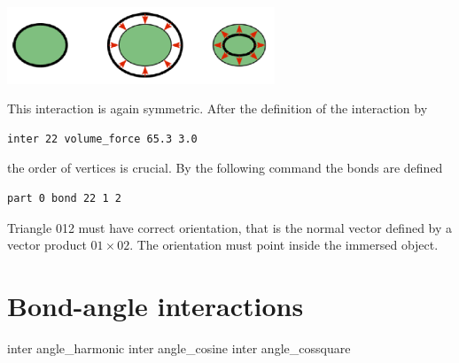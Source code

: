 \begin{center}
  \includegraphics[width=8cm]{figures/volume.png}
\end{center}
This interaction is again symmetric. After the definition of the interaction by 
\begin{verbatim} 
inter 22 volume_force 65.3 3.0
\end{verbatim}
the order of vertices is crucial. By the following command the bonds are defined
\begin{verbatim} 
part 0 bond 22 1 2
\end{verbatim}
Triangle 012 must have correct orientation, that is the normal vector defined by a 
vector product $01\times02$. The orientation must point inside the immersed object.


\section{Bond-angle interactions}
\label{sec:angle}

\begin{essyntax}
   inter  angle\_harmonic  
   inter  angle\_cosine  
   inter  angle\_cossquare  
  \begin{features}
  \end{features}
\end{essyntax}


